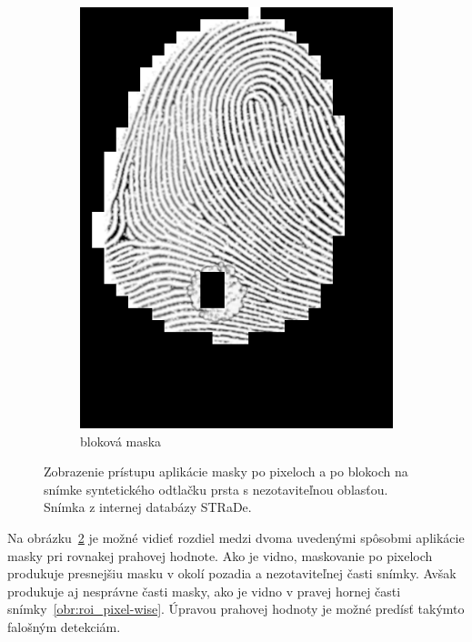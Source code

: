 \begin{figure}[h]
\begin{subfigure}[b]{0.3\linewidth}
      \includegraphics[width=\linewidth]{obrazky-figures/roi_block-wise.png}
      \caption{bloková maska}
      \label{obr:roi_block-wise}
    \end{subfigure}
    \caption{Zobrazenie prístupu aplikácie masky po pixeloch a po blokoch na snímke syntetického odtlačku prsta s nezotaviteľnou oblasťou.
            Snímka z internej databázy STRaDe.}
    \label{obr:typy_roi_masiek}
  \end{figure}

  Na obrázku~{\ref{obr:typy_roi_masiek}} je možné vidieť rozdiel medzi dvoma uvedenými spôsobmi aplikácie masky pri rovnakej prahovej hodnote.
  Ako je vidno, maskovanie po pixeloch produkuje presnejšiu masku v okolí pozadia a nezotaviteľnej časti snímky. Avšak produkuje aj nesprávne časti masky,
  ako je vidno v pravej hornej časti snímky~{\ref{obr:roi_pixel-wise}}. Úpravou prahovej hodnoty je možné predísť takýmto falošným detekciám.
  
